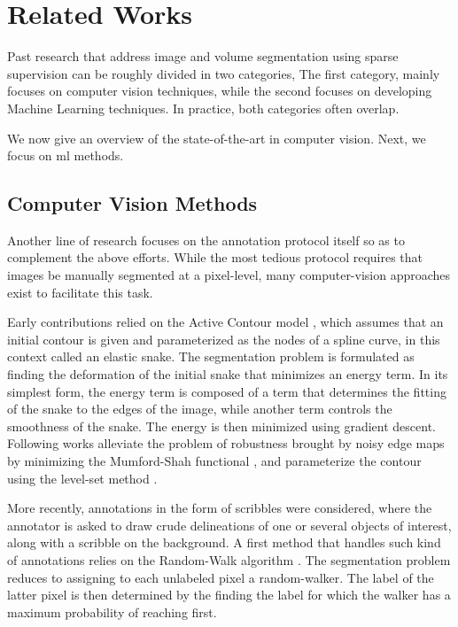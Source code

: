 \section{Related Works}

Past research that address image and volume segmentation using sparse supervision can be roughly divided in two categories,
The first category, mainly focuses on computer vision techniques, while the second focuses on developing Machine Learning techniques.
In practice, both categories often overlap.

We now give an overview of the state-of-the-art in computer vision.
Next, we focus on \gls{ml} methods.


\subsection{Computer Vision Methods}
Another line of research focuses on the annotation protocol itself so as to complement the above efforts.
While the most tedious protocol requires that images be manually segmented at a pixel-level, many computer-vision approaches exist to facilitate this task.

Early contributions relied on the Active Contour model \cite{kass88}, which assumes that an initial contour is given and parameterized as the nodes of a spline curve, in this context called an elastic snake.
The segmentation problem is formulated as finding the deformation of the initial snake that minimizes an energy term.
In its simplest form, the energy term is composed of a term that determines the fitting of the snake to the edges of the image, while another term controls the smoothness of the snake.
The energy is then minimized using gradient descent.
Following works alleviate the problem of robustness brought by noisy edge maps by minimizing the Mumford-Shah functional \cite{chan01}, and parameterize the contour using the level-set method \cite{osher88}.

More recently, annotations in the form of scribbles were considered, where the annotator is asked to draw crude delineations of one or several objects of interest, along with a scribble on the background.
A first method that handles such kind of annotations relies on the Random-Walk algorithm \cite{grady06}.
The segmentation problem reduces to assigning to each unlabeled pixel a random-walker. The label of the latter pixel is then determined by the finding the label for which the walker has a maximum probability of reaching first.

